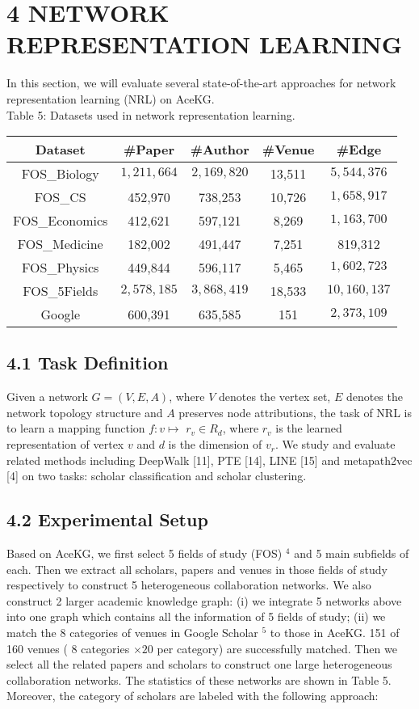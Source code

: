 \documentclass[10pt]{article}
\begin{document}
\section*{4 NETWORK REPRESENTATION LEARNING}
In this section, we will evaluate several state-of-the-art approaches for network representation learning (NRL) on AceKG.\\
Table 5: Datasets used in network representation learning.

\begin{center}
\begin{tabular}{c|cccc}
\hline
Dataset & \#Paper & \#Author & \#Venue & \#Edge \\
\hline
FOS\_Biology & $1,211,664$ & $2,169,820$ & 13,511 & $5,544,376$ \\
FOS\_CS & 452,970 & 738,253 & 10,726 & $1,658,917$ \\
FOS\_Economics & 412,621 & 597,121 & 8,269 & $1,163,700$ \\
FOS\_Medicine & 182,002 & 491,447 & 7,251 & 819,312 \\
FOS\_Physics & 449,844 & 596,117 & 5,465 & $1,602,723$ \\
\hline
FOS\_5Fields & $2,578,185$ & $3,868,419$ & 18,533 & $10,160,137$ \\
Google & 600,391 & 635,585 & 151 & $2,373,109$ \\
\hline
\end{tabular}
\end{center}

\subsection*{4.1 Task Definition}
Given a network $G=(V, E, A)$, where $V$ denotes the vertex set, $E$ denotes the network topology structure and $A$ preserves node attributions, the task of NRL is to learn a mapping function $f: v \mapsto$ $r_{v} \in R_{d}$, where $r_{v}$ is the learned representation of vertex $v$ and $d$ is the dimension of $v_{r}$. We study and evaluate related methods including DeepWalk [11], PTE [14], LINE [15] and metapath2vec [4] on two tasks: scholar classification and scholar clustering.

\subsection*{4.2 Experimental Setup}
Based on AceKG, we first select 5 fields of study (FOS) ${ }^{4}$ and 5 main subfields of each. Then we extract all scholars, papers and venues in those fields of study respectively to construct 5 heterogeneous collaboration networks. We also construct 2 larger academic knowledge graph: (i) we integrate 5 networks above into one graph which contains all the information of 5 fields of study; (ii) we match the 8 categories of venues in Google Scholar ${ }^{5}$ to those in AceKG. 151 of 160 venues ( 8 categories $\times 20$ per category) are successfully matched. Then we select all the related papers and scholars to construct one large heterogeneous collaboration networks. The statistics of these networks are shown in Table 5. Moreover, the category of scholars are labeled with the following approach:
\end{document}

